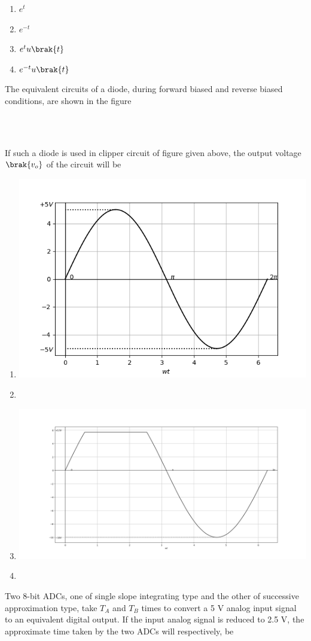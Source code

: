\begin{enumerate}
    \item $e^t$
    \item $e^{-t}$
    \item $e^tu\brak{t}$
    \item $e^{-t}u\brak{t}$ \\
\end{enumerate}
\item The equivalent circuits of a diode, during forward biased and reverse biased conditions, are shown in the figure
\begin{figure}[!ht]
\centering
\resizebox{0.5\textwidth}{!}{%

}%
\end{figure}\\
\begin{figure}[!ht]
\centering
\resizebox{0.5\textwidth}{!}{%

}%
\end{figure}
\\
If such a diode is used in clipper circuit of figure given above, the output voltage $\brak{v_o}$ of the circuit will be 
 \begin{enumerate}
     \item 
      \includegraphics[width=0.3\linewidth]{figs/2008-EE/A8.1.png}
        \item 
\resizebox{0.3\textwidth}{!}{%

}%
     \item 
      \includegraphics[width=0.3\linewidth]{figs/2008-EE/A8.3.png}
     \item 
\resizebox{0.3\textwidth}{!}{%

}%

 \end{enumerate}
\item Two 8-bit ADCs, one of single slope integrating type and the other of successive approximation type, take $T_A$ and $T_B$ times to convert a 5 V analog input signal to an equivalent digital output. If the input analog signal is reduced to 2.5 V, the approximate time taken by the two ADCs will respectively, be
